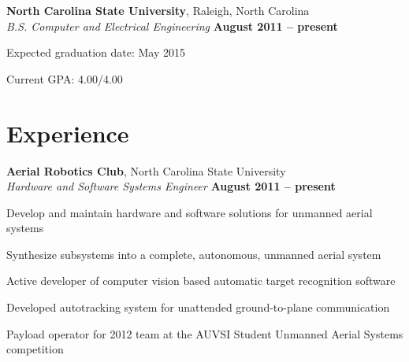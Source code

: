 \documentclass[margin,line,letterpaper]{resume}
\begin{document}
\begin{resume}
    \textbf{North Carolina State University}, Raleigh, North Carolina \vspace{2mm}\\\vspace{1mm}%
    \textsl{B.S. Computer and Electrical Engineering} \hfill \textbf{ August 2011 -- present}\vspace{-3mm}\\\vspace{-1mm}%
    \begin{list2}
        \item Expected graduation date: May 2015
        \item Current GPA: 4.00/4.00
    \end{list2}\vspace{-1.5mm}


    \section{\mysidestyle Experience}

    \textbf{Aerial Robotics Club}, North Carolina State University \vspace{2mm}\\\vspace{1mm}%
    \textsl{Hardware and Software Systems Engineer} \hfill \textbf{August 2011 -- present}\vspace{-3mm}\\\vspace{-1mm}%
    \begin{list2}
    \item Develop and maintain hardware and software solutions for unmanned aerial systems
    \item Synthesize subsystems into a complete, autonomous, unmanned aerial system
    \item Active developer of computer vision based automatic target recognition software
    \item Developed autotracking system for unattended ground-to-plane communication
    \item Payload operator for 2012 team at the AUVSI Student Unmanned Aerial Systems competition
    \end{list2}\vspace{-1.5mm}


\end{resume}
\end{document}
